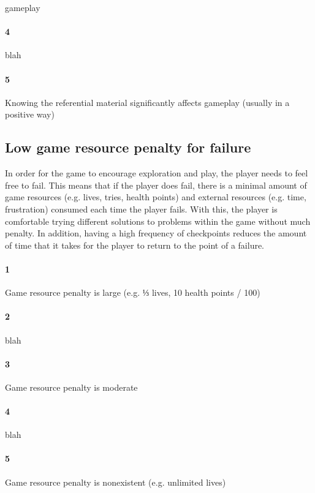 gameplay\paragraph{4}blah\paragraph{5}Knowing the referential material significantly affects gameplay (usually in a positive way)\subsection{Low game resource penalty for failure}{In order for the game to encourage exploration and play, the player needs to feel free to fail. This means that if the player does fail, there is a minimal amount of game resources (e.g. lives, tries, health points) and external resources (e.g. time, frustration) consumed each time the player fails. With this, the player is comfortable trying different solutions to problems within the game without much penalty. In addition, having a high frequency of checkpoints reduces the amount of time that it takes for the player to return to the point of a failure.} \paragraph{1}Game resource penalty is large (e.g. ⅓ lives, 10 health points / 100)\paragraph{2}blah\paragraph{3}Game resource penalty is moderate\paragraph{4}blah\paragraph{5}Game resource penalty is nonexistent (e.g. unlimited lives)